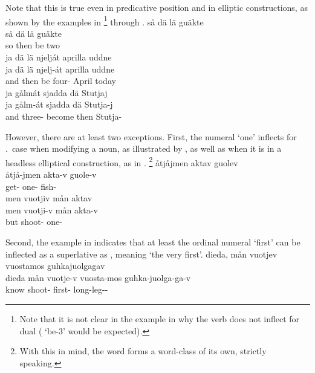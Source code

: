 Note that this is true even in predicative position and in elliptic constructions, as shown by the examples in \footnote{Note that it is not clear in the example in  why the verb does not inflect for dual ( ‘be-3’ would be expected).} 
through .
\ea\label{numeralEx3}%
\glll	så dä lä guäkte\\
	så dä lä guäkte\\
	so then be\BS{} two\\\nopagebreak
{}	
\z
\ea\label{numeralEx2}%
\glll	ja dä lä njelját aprilla uddne\\
	ja dä lä njelj-át aprilla uddne\\
	and then be\BS{} four- April today\\\nopagebreak
{}	
\z
\ea\label{numeralEx4}%
\glll	ja gålmát sjadda dä Stutjaj\\
	ja gålm-át sjadda dä Stutja-j\\
	and three- become\BS{} then Stutja-\\\nopagebreak
{}	
\z

However, there are at least two exceptions. First, the numeral  ‘one’ inflects for \ACCs.\SGs\ case when modifying a noun, as illustrated by , as well as when it is in a headless elliptical construction, as in .%
\footnote{With this in mind, the word  forms a word-class of its own, strictly speaking.}
\ea\label{numOneEx1}
\glll	åtjåjmen aktav guolev\\
	åtjå-jmen akta-v guole-v\\
	get- one- fish-\\\nopagebreak
{}	
\z
\ea\label{numOneEx2}
\glll	men vuotjiv mån aktav\\
	men vuotji-v mån akta-v\\
	but shoot-  one-\\\nopagebreak
{}	
\z

Second, the example in  indicates that at least the ordinal numeral  ‘first’ can be inflected as a superlative as , meaning ‘the very first’. 
\ea\label{veryFirstEx}%
\glll	dieda, mån vuotjev vuostamos guhkajuolgagav\\
	dieda mån vuotje-v vuosta-mos guhka-juolga-ga-v\\
	know\BS{}  shoot- first- long-leg--\\\nopagebreak
{}	
\z





%